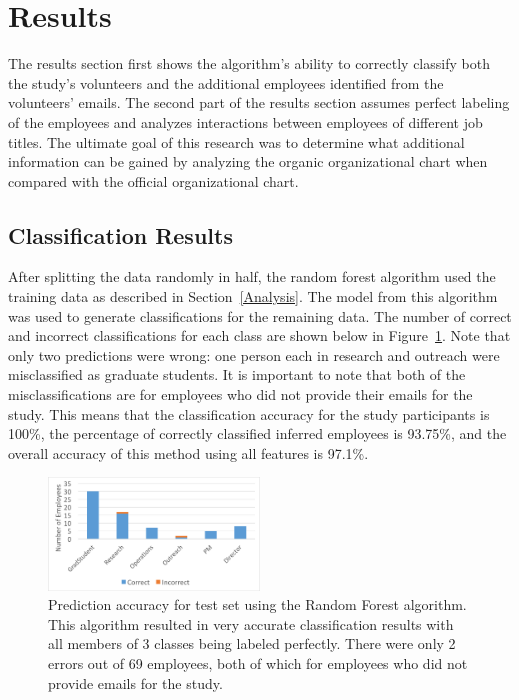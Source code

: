 \documentclass{article}
\begin{document}
\section{Results} \label{Results}

The results section first shows the algorithm's ability to correctly classify both the study's volunteers and the additional employees identified from the volunteers' emails.  The second part of the results section assumes perfect labeling of the employees and analyzes interactions between employees of different job titles.  The ultimate goal of this research was to determine what additional information can be gained by analyzing the organic organizational chart when compared with the official organizational chart.

\subsection{Classification Results}
After splitting the data randomly in half, the random forest algorithm used the training data as described in Section~\ref{Analysis}.  The model from this algorithm was used to generate classifications for the  remaining data.  The number of correct and incorrect classifications for each class are shown below in Figure~\ref{fig:result_hist}.  Note that only two predictions were wrong: one person each in research and outreach were misclassified as graduate students.  It is important to note that both of the misclassifications are for employees who did not provide their emails for the study.  This means that the classification accuracy for the study participants is 100\%, the percentage of correctly classified inferred employees is 93.75\%, and the overall accuracy of this method using all features is 97.1\%.  

\begin{figure}[H]
    \centering
        \includegraphics[width=0.5\textwidth]{Prediction_50_50_RF}
        \caption{Prediction accuracy for test set using the Random Forest algorithm.  This algorithm resulted in very accurate classification results with all members of 3 classes being labeled perfectly.  There were only 2 errors out of 69 employees, both of which for employees who did not provide emails for the study.}
        \label{fig:result_hist}
\end{figure}
\end{document}

